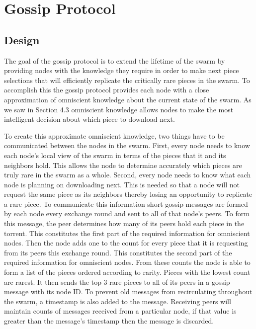\section{Gossip Protocol}

\subsection{Design}

The goal of the gossip protocol is to extend the lifetime of the swarm
by providing nodes with the knowledge they require in order to make
next piece selections that will efficiently replicate the critically
rare pieces in the swarm. To accomplish this the gossip protocol
provides each node with a close approximation of omniscient knowledge
about the current state of the swarm. As we saw in Section 4.3
omniscient knowledge allows nodes to make the most intelligent
decision about which piece to download next. 

To create this approximate omniscient knowledge, two things have to be
communicated between the nodes in the swarm. First, every node needs
to know each node's local view of the swarm in terms of the pieces
that it and its neighbors hold. This allows the node to determine
accurately which pieces are truly rare in the swarm as a whole. Second, every
node needs to know what each node is planning on downloading
next. This is needed so that a node will not request the same piece as
its neighbors thereby losing an opportunity to replicate a rare
piece. To communicate this information short gossip messages are
formed by each node every exchange round and sent to all of that
node's peers. To form this message, the peer determines how many of
its peers hold each piece in the torrent. This constitutes the first
part of the required information for omniscient nodes. Then the node
adds one to the count for every piece that it is requesting from its
peers this exchange round. This constitutes the second part of the
required information for omniscient nodes. From these counts the node
is able to form a list of the pieces ordered according to rarity.
Pieces with the lowest count are rarest. It then sends the top 3 rare
pieces to all of its peers in a gossip message with its node ID. To
prevent old messages from recirculating throughout the swarm, a
timestamp is also added to the message. Receiving peers will maintain
counts of messages received from a particular node, if that value is
greater than the message's timestamp then the message is discarded.

